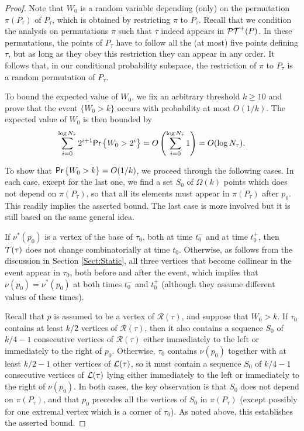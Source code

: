 \documentclass[11pt]{article}
\def\PT{{\cal PT}}
\def\T{{\cal T}}
\def\L{{\cal L}}
\def\R{\mathcal{R}}
\def\prob{{\sf Pr}}
\begin{document}
\begin{proof}
  Note that $W_0$ is a random variable depending (only) on the permutation
  $\pi(P_\tau)$ of $P_\tau$, which is obtained by restricting $\pi$ to
  $P_\tau$. Recall that we condition the analysis on permutations 
$\pi$ such that $\tau$ indeed appears in $\PT^+(P)$.
In these permutations, the points of $P_\tau$ have to follow all the (at most) five points defining $\tau$,
but as long as they obey this restriction
they can appear in any order.
It follows that, in our conditional probability subspace, the restriction
of $\pi$ to $P_\tau$ is a random permutation of  $P_\tau$.

To bound the expected value of $W_0$, we fix an arbitrary threshold $k\geq 10$ and prove that the event $\{W_0>k\}$ occurs with probability at most $O(1/k)$. The expected value of $W_0$ is then bounded
by 
\begin{equation}\label{Eq:LogCost}
\sum_{i=0}^{\log N_\tau} 2^{i+1}\prob\left\{W_0>2^i\right\}=O\left(\sum_{i=0}^{\log N_\tau} 1\right)=O(\log N_\tau).
\end{equation}

To show that $\prob\left\{W_0>k\right\}=O(1/k)$, we proceed through the following cases. In each case, except for the last one, we find a set $S_0$ of $\Omega(k)$ points which does not depend on $\pi(P_\tau)$, so that all its elements must appear in $\pi(P_\tau)$ after $p_0$. This readily implies the asserted bound. The last case is more involved but it is still based on the same general idea.

\medskip
{} 
If $\nu^*(p_0)$ is a vertex of the base of $\tau_0$, both at time $t_0^-$ and at time $t_0^+$, then $\T(\tau)$ does not change combinatorially at time $t_0$. Otherwise, as follows from the discussion in Section \ref{Sect:Static}, all three vertices that become collinear in the event appear in $\tau_0$, both before and after the event, which implies that $\nu(p_0)=\nu^*(p_0)$ at both times $t_0^-$ and $t_0^+$ (although they assume different values of these times).


Recall that $p$ is assumed to be a vertex of $\R(\tau)$, and suppose that $W_0>k$.  If $\tau_0$ contains at least $k/2$ vertices of
$\R(\tau)$, then it also contains a sequence $S_0$ of $k/4-1$
consecutive vertices of $\R(\tau)$ either immediately to the
left or immediately to the right of $p_0$.  Otherwise, $\tau_0$
contains $\nu(p_0)$ together with at least $k/2-1$ other vertices of
$\L(\tau)$, so it must contain a sequence $S_0$ of $k/4-1$
consecutive vertices of $\L(\tau)$ lying either immediately to the
left or immediately to the right of $\nu (p_0)$.  In both cases, the
key observation is that $S_0$ does not depend on
$\pi(P_\tau)$, and that $p_0$
precedes all the vertices of $S_0$ in $\pi(P_\tau)$ (except possibly for
one extremal vertex which is a corner of $\tau_0$). As noted above, this establishes the asserted bound.



\end{proof}
\end{document}
